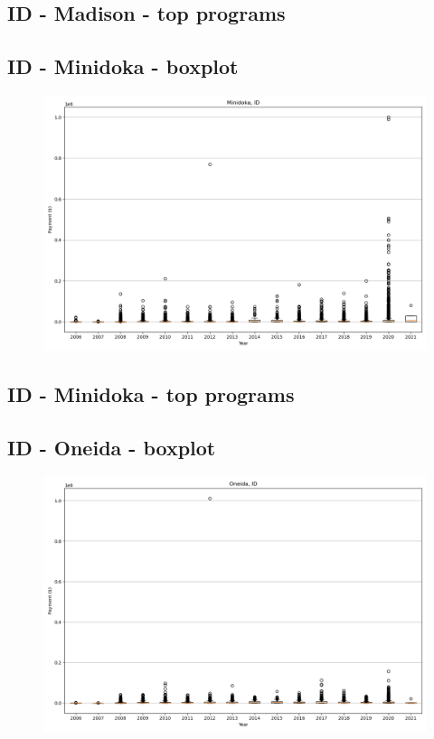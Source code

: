 \subsection*{ID - Madison - top programs}

\newpage
\subsection*{ID - Minidoka - boxplot}
\begin{figure}[h]
\centering
\includegraphics[width=7in]{../output/boxplots/counties/Minidoka-ID_boxplot.png}
\end{figure}


\subsection*{ID - Minidoka - top programs}

\newpage
\subsection*{ID - Oneida - boxplot}
\begin{figure}[h]
\centering
\includegraphics[width=7in]{../output/boxplots/counties/Oneida-ID_boxplot.png}
\end{figure}


